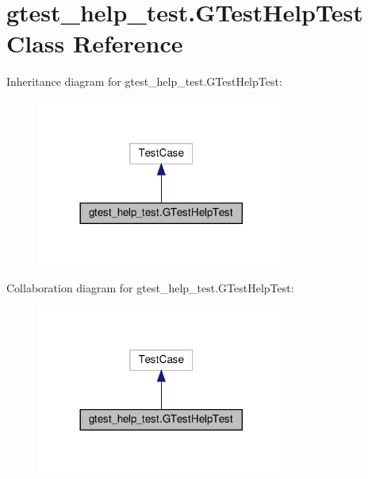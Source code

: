\hypertarget{classgtest__help__test_1_1_g_test_help_test}{}\section{gtest\+\_\+help\+\_\+test.\+G\+Test\+Help\+Test Class Reference}
\label{classgtest__help__test_1_1_g_test_help_test}


Inheritance diagram for gtest\+\_\+help\+\_\+test.\+G\+Test\+Help\+Test\+:
\nopagebreak
\begin{figure}[H]
\begin{center}
\leavevmode
\includegraphics[width=233pt]{classgtest__help__test_1_1_g_test_help_test__inherit__graph}
\end{center}
\end{figure}


Collaboration diagram for gtest\+\_\+help\+\_\+test.\+G\+Test\+Help\+Test\+:
\nopagebreak
\begin{figure}[H]
\begin{center}
\leavevmode
\includegraphics[width=233pt]{classgtest__help__test_1_1_g_test_help_test__coll__graph}
\end{center}
\end{figure}
